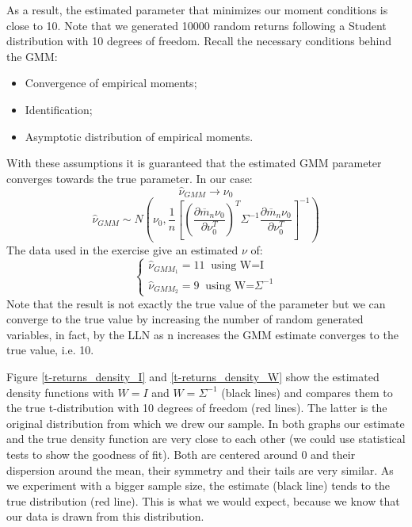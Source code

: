 \newpage
As a result, the estimated parameter that minimizes our moment conditions is close to 10. Note that we generated 10000 random returns following a Student distribution with 10 degrees of freedom. Recall the necessary conditions behind the GMM:
\begin{itemize}
    \item Convergence of empirical moments;
    \item Identification;
    \item Asymptotic distribution of empirical moments.
\end{itemize}
With these assumptions it is guaranteed that the estimated GMM parameter converges towards the true parameter. In our case:
\begin{equation*}
        \widehat{\nu}_{GMM} \to \nu_0
\end{equation*}
\begin{equation*}
        \widehat{\nu}_{GMM} \sim N(\nu_0,
        \frac{1}{n}[(\frac{\partial\overline{m}_n\nu_0}{\partial\nu_0^T})^T\Sigma^{-1}\frac{\partial\overline{m}_n\nu_0}{\partial\nu_0^T}]^{-1})
\end{equation*}
The data used in the exercise give an estimated $\nu$ of:
\begin{equation*}
    \begin{cases}
    \widehat{\nu}_{GMM_{1}}=11 \;\;\text{using W=I}\\
    \widehat{\nu}_{GMM_{2}}=9 \;\;\text{using W=}\Sigma^{-1}
\end{cases}
\end{equation*}
Note that the result is not exactly the true value of the parameter but we can converge to the true value by increasing the number of random generated variables, in fact, by the LLN as n increases the GMM estimate converges to the true value, i.e. 10.

Figure \ref{t-returns_density_I} and \ref{t-returns_density_W} show the estimated density functions with $W=I$ and $W=\Sigma^{-1}$ (black lines) and compares them to the true t-distribution with 10 degrees of freedom (red lines). The latter is the original distribution from which we drew our sample. In both graphs our estimate and the true density function are very close to each other (we could use statistical tests to show the goodness of fit). Both are centered around 0 and their dispersion around the mean, their symmetry and their tails are very similar. As we experiment with a bigger sample size, the estimate  (black line) tends to the true distribution (red line). This is what we would expect, because we know that our data is drawn from this distribution.


